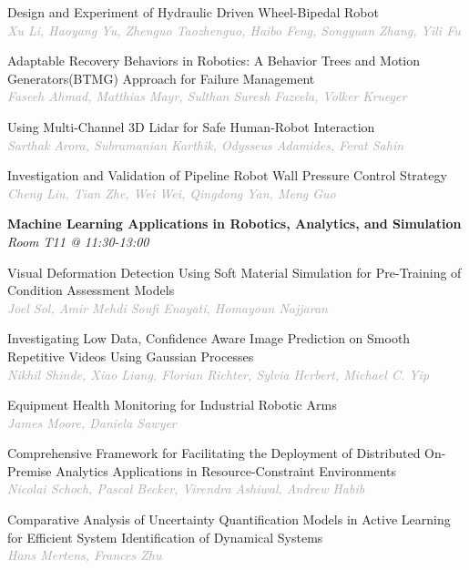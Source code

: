 \begin{multicols*}{2}
\small Design and Experiment of Hydraulic Driven Wheel-Bipedal Robot\\ 
\footnotesize \textcolor{darkgray}{\textit{Xu Li, Haoyang  Yu, Zhenguo  Taozhenguo, Haibo  Feng, Songyuan  Zhang, Yili  Fu}}

\small Adaptable Recovery Behaviors in Robotics: A Behavior Trees and Motion Generators(BTMG) Approach for Failure Management\\ 
\footnotesize \textcolor{darkgray}{\textit{Faseeh Ahmad, Matthias  Mayr, Sulthan  Suresh Fazeela, Volker  Krueger}}

\small Using Multi-Channel 3D Lidar for Safe Human-Robot Interaction\\ 
\footnotesize \textcolor{darkgray}{\textit{Sarthak Arora, Subramanian  Karthik, Odysseus  Adamides, Ferat  Sahin}}

\small Investigation and Validation of Pipeline Robot Wall Pressure Control Strategy\\ 
\footnotesize \textcolor{darkgray}{\textit{Cheng Liu, Tian  Zhe, Wei  Wei, Qingdong  Yan, Meng  Guo}}

\normalsize \textbf{Machine Learning Applications in Robotics, Analytics, and Simulation}\\
\small \textit{Room T11 @ 11:30-13:00}

\small Visual Deformation Detection Using Soft Material Simulation for Pre-Training of Condition Assessment Models\\ 
\footnotesize \textcolor{darkgray}{\textit{Joel Sol, Amir Mehdi  Soufi Enayati, Homayoun  Najjaran}}

\small Investigating Low Data, Confidence Aware Image Prediction on Smooth Repetitive Videos Using Gaussian Processes\\ 
\footnotesize \textcolor{darkgray}{\textit{Nikhil Shinde, Xiao  Liang, Florian  Richter, Sylvia  Herbert, Michael C.  Yip}}

\small Equipment Health Monitoring for Industrial Robotic Arms\\ 
\footnotesize \textcolor{darkgray}{\textit{James Moore, Daniela  Sawyer}}

\small Comprehensive Framework for Facilitating the Deployment of Distributed On-Premise Analytics Applications in Resource-Constraint Environments\\ 
\footnotesize \textcolor{darkgray}{\textit{Nicolai Schoch, Pascal  Becker, Virendra  Ashiwal, Andrew  Habib}}

\small Comparative Analysis of Uncertainty Quantification Models in Active Learning for Efficient System Identification of Dynamical Systems\\ 
\footnotesize \textcolor{darkgray}{\textit{Hans Mertens, Frances  Zhu}}


\end{multicols*}
